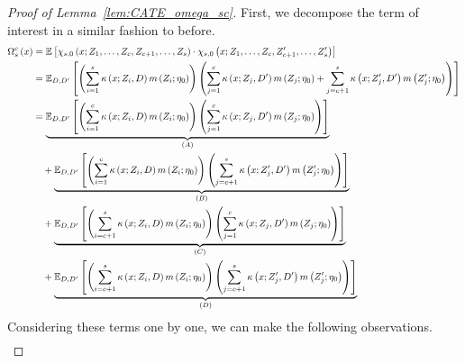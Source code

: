 \begin{proof}[Proof of Lemma~\ref{lem:CATE_omega_sc}]
    First, we decompose the term of interest in a similar fashion to before.
	\begin{equation}
        \begin{aligned}
            \Omega_{s}^{c}\left(x\right)
		    & = \mathbb{E}\left[\chi_{s,0}\left(x; Z_1, \ldots, Z_{c}, Z_{c+1}, \ldots, Z_{s}\right) \cdot
			\chi_{s,0}\left(x; Z_1, \ldots,Z_{c}, Z_{c+1}^{\prime}, \ldots, Z_{s}^{\prime}\right)\right]\\
            & = \mathbb{E}_{D, D^{\prime}}\left[
                \left(\sum_{i = 1}^{s} \kappa\left(x; Z_{i}, D\right) m\left(Z_{i}; \eta_{0}\right)\right) 
                \left(\sum_{j = 1}^{c} \kappa\left(x; Z_{j}, D^{\prime}\right) m\left(Z_{j}; \eta_{0}\right) + \sum_{j = c + 1}^{s} \kappa\left(x; Z_{j}^{\prime}, D^{\prime}\right) m\left(Z_{j}^{\prime}; \eta_{0}\right)\right)
            \right]\\
            & = \underbrace{\mathbb{E}_{D, D^{\prime}}\left[\left(\sum_{i = 1}^{c} \kappa\left(x; Z_{i}, D\right) m\left(Z_{i}; \eta_{0}\right)\right)
            \left(\sum_{j = 1}^{c} \kappa\left(x; Z_{j}, D^{\prime}\right) m\left(Z_{j}; \eta_{0}\right)\right)\right]}_{(A)} \\
            & \quad + \underbrace{\mathbb{E}_{D, D^{\prime}}\left[\left(\sum_{i = 1}^{c} \kappa\left(x; Z_{i}, D\right) m\left(Z_{i}; \eta_{0}\right)\right)
            \left(\sum_{j = c + 1}^{s} \kappa\left(x; Z_{j}^{\prime}, D^{\prime}\right) m\left(Z_{j}^{\prime}; \eta_{0}\right)\right)\right]}_{(B)} \\
            & \quad + \underbrace{\mathbb{E}_{D, D^{\prime}}\left[\left(\sum_{i = c + 1}^{s} \kappa\left(x; Z_{i}, D\right) m\left(Z_{i}; \eta_{0}\right)\right)
            \left(\sum_{j = 1}^{c} \kappa\left(x; Z_{j}, D^{\prime}\right) m\left(Z_{j}; \eta_{0}\right)\right)\right]}_{(C)} \\
            & \quad + \underbrace{\mathbb{E}_{D, D^{\prime}}\left[\left(\sum_{i = c + 1}^{s} \kappa\left(x; Z_{i}, D\right) m\left(Z_{i}; \eta_{0}\right)\right)
            \left(\sum_{j = c + 1}^{s} \kappa\left(x; Z_{j}^{\prime}, D^{\prime}\right) m\left(Z_{j}^{\prime}; \eta_{0}\right)\right)\right]}_{(D)} 
        \end{aligned}
    \end{equation}
    Considering these terms one by one, we can make the following observations.
    \begin{equation}
        \begin{aligned}

\end{aligned}
\end{equation}
\end{proof}
